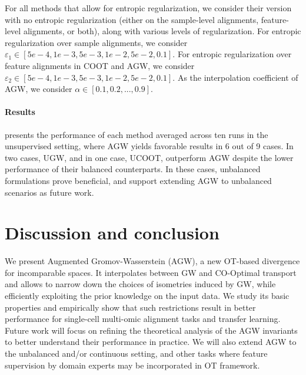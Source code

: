 For all methods that allow for entropic regularization,
we consider their version with no entropic regularization (either on the sample-level alignments,
feature-level alignments, or both), along with various levels of regularization.
For entropic regularization over sample alignments, we consider
$\varepsilon_1 \in [ 5e-4, 1e-3, 5e-3, 1e-2, 5e-2, 0.1] $. For entropic regularization over
feature alignments in COOT and AGW, we consider $\varepsilon_2 \in [ 5e-4, 1e-3, 5e-3, 1e-2, 5e-2, 0.1]$.
As the interpolation coefficient of AGW, we consider $\alpha \in [ 0.1, 0.2, ..., 0.9]$.

\paragraph{Results}  presents the performance of each method averaged across
ten runs in the unsupervised setting, where AGW yields favorable results in 6 out of 9 cases.
In two cases, UGW, and in one case, UCOOT, outperform AGW despite the lower performance of
their balanced counterparts. In these cases, unbalanced formulations prove beneficial,
and support extending AGW to unbalanced scenarios as future work.

\section{Discussion and conclusion}

We present Augmented Gromov-Wasserstein (AGW), a new OT-based divergence for incomparable spaces.
It interpolates between GW and CO-Optimal transport and allows to narrow down the
choices of isometries induced by GW, while efficiently exploiting the prior knowledge
on the input data. We study its basic properties and empirically show that such restrictions
result in better performance for single-cell multi-omic alignment tasks and transfer learning.
Future work will focus on refining the theoretical analysis of the AGW invariants to
better understand their performance in practice. We will also extend AGW to the unbalanced
and/or continuous setting, and other tasks where feature supervision by domain experts
may be incorporated in OT framework.

\vfill